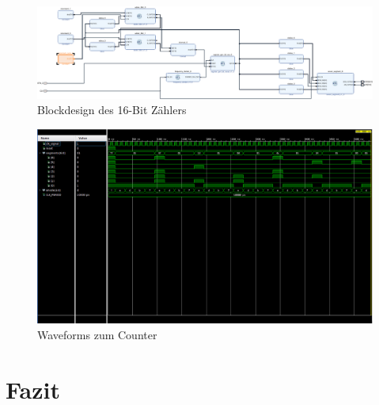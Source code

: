 \documentclass[11pt, a4paper]{article}
\begin{document}
\begin{figure}[H]    
    \centering
    \includegraphics[width=\linewidth]{versuch7Data/counter.pdf}
    \caption{Blockdesign des 16-Bit Zählers}
    \label{aufbauZähler}        
\end{figure}
\begin{figure}[H]    
    \centering
    \includegraphics[width=\linewidth]{versuch7Data/counter.png}
    \caption{Waveforms zum Counter}
    \label{waveformCounter}        
\end{figure}

\section*{Fazit}
\end{document}
